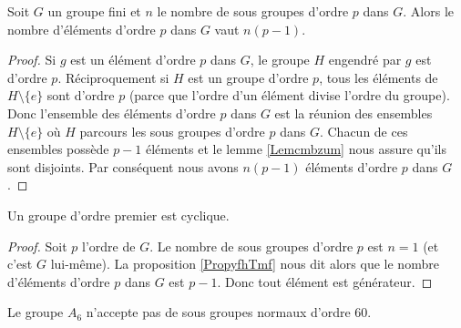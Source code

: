 \begin{proposition} \label{PropyfhTmf}
    Soit \( G\) un groupe fini et \( n\) le nombre de sous groupes d'ordre \( p\) dans \( G\). Alors le nombre d'éléments d'ordre \( p\) dans \( G\) vaut \( n(p-1)\).
\end{proposition}

\begin{proof}
    Si \( g\) est un élément d'ordre \( p\) dans \( G\), le groupe \( H\) engendré par \( g\) est d'ordre \( p\). Réciproquement si \( H\) est un groupe d'ordre \( p\), tous les éléments de \( H\setminus\{ e \}\) sont d'ordre \( p\) (parce que l'ordre d'un élément divise l'ordre du groupe). Donc l'ensemble des éléments d'ordre \( p\) dans \( G\) est la réunion des ensembles \( H\setminus\{ e \}\) où \( H\) parcours les sous groupes d'ordre \( p\) dans \( G\). Chacun de ces ensembles possède \( p-1\) éléments et le lemme \ref{Lemcmbzum} nous assure qu'ils sont disjoints. Par conséquent nous avons \( n(p-1)\) éléments d'ordre \( p\) dans \( G\).
\end{proof}

\begin{corollary}
    Un groupe d'ordre premier est cyclique.
\end{corollary}

\begin{proof}
    Soit \( p\) l'ordre de \( G\). Le nombre de sous groupes d'ordre \( p\) est \( n=1\) (et c'est \( G\) lui-même). La proposition \ref{PropyfhTmf} nous dit alors que le nombre d'éléments d'ordre \( p\) dans \( G\) est \( p-1\). Donc tout élément est générateur.
\end{proof}

\begin{lemma}
    Le groupe \( A_6\) n'accepte pas de sous groupes normaux d'ordre \( 60\).
\end{lemma}

